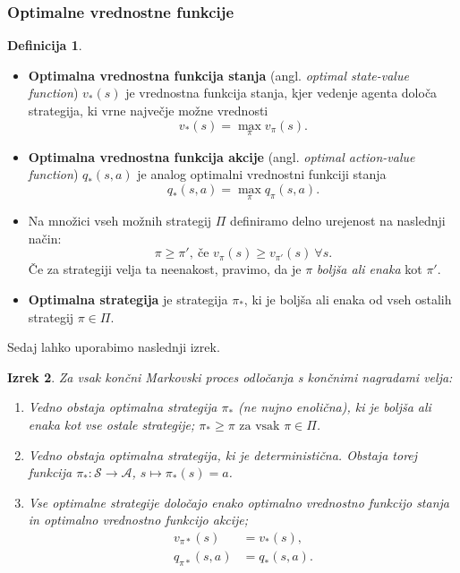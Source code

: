 \documentclass[12pt,a4paper]{amsart}
\theoremstyle{definition} %
\newtheorem{definicija}{Definicija}[section]
\theoremstyle{plain} %
\newtheorem{izrek}[definicija]{Izrek}
\begin{document}
\subsubsection{Optimalne vrednostne funkcije}
\begin{definicija}
    ~
    \begin{itemize}
        \item \textbf{Optimalna vrednostna funkcija stanja} (angl. \textit{optimal state-value 
                function}) $v_*(s)$ je vrednostna funkcija stanja, kjer vedenje agenta določa 
                strategija, ki vrne največje možne vrednosti
                $$
                v_*(s) = \max_\pi v_\pi(s).
                $$
        \item \textbf{Optimalna vrednostna funkcija akcije} (angl. \textit{optimal action-value 
                function}) $q_*(s, a)$ je analog optimalni vrednostni funkciji stanja
                $$
                q_*(s, a) = \max_\pi q_\pi(s, a).
                $$
        \item Na množici vseh možnih strategij $\Pi$ definiramo delno urejenost na naslednji način:
                $$
                \pi \geq \pi', \medspace \text{če } v_\pi(s) \geq v_{\pi'}(s) ~ \forall s. 
                $$
                Če za strategiji velja ta neenakost, pravimo, da je $\pi$ \textit{boljša ali enaka} 
                kot $\pi'$.
        \item \textbf{Optimalna strategija} je strategija $\pi_*$, ki je boljša ali enaka od vseh 
                ostalih strategij $\pi \in \Pi$.
    \end{itemize}
\end{definicija}
Sedaj lahko uporabimo naslednji izrek.

\begin{izrek}\label{optim}
    Za vsak končni Markovski proces odločanja s končnimi nagradami velja: 
    \begin{enumerate}
        \item Vedno obstaja \textit{optimalna} strategija $\pi_*$ (ne nujno enolična), ki je boljša 
                ali enaka kot vse ostale strategije; $\pi_* \geq \pi \text{ za vsak }  \pi \in \Pi$. 
        
        \item Vedno obstaja optimalna strategija, ki je \textit{deterministična}. Obstaja torej funkcija  
                $\pi_*: \mathcal{S} \rightarrow \mathcal{A}$, $s \mapsto \pi_*(s) = a$.

        \item Vse optimalne strategije določajo enako optimalno vrednostno funkcijo stanja in 
                optimalno vrednostno funkcijo akcije; 
                \begin{align*}
                    v_{\pi*}(s) &= v_*(s), \\
                    q_{\pi*}(s, a) &= q_*(s, a).
                \end{align*}
    \end{enumerate} 
\end{izrek}
\end{document}
